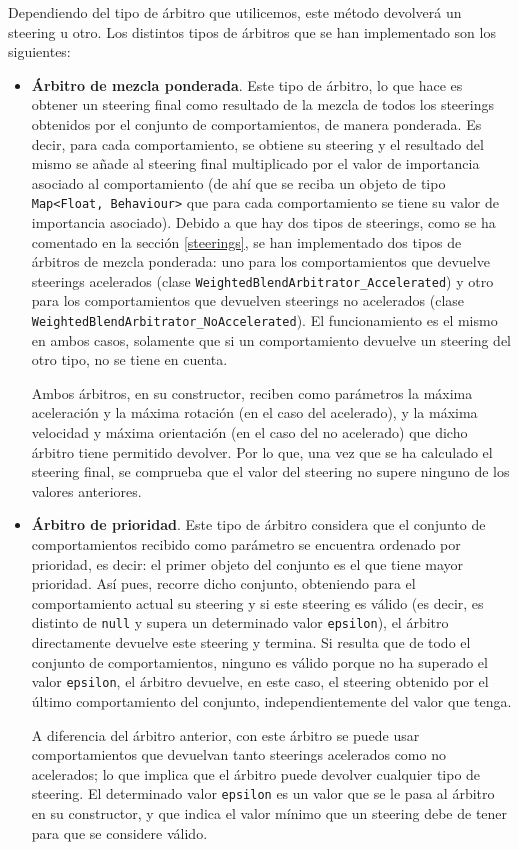 Dependiendo del tipo de árbitro que utilicemos, este método devolverá un steering u otro. Los distintos tipos de árbitros que se han implementado son los siguientes:
\begin{itemize}
 \item \textbf{Árbitro de mezcla ponderada}. Este tipo de árbitro, lo que hace es obtener un steering final como resultado de la mezcla de todos los steerings obtenidos por el conjunto de comportamientos, de manera ponderada. Es decir, para cada comportamiento, se obtiene su steering y el resultado del mismo se añade al steering final multiplicado por el valor de importancia asociado al comportamiento (de ahí que se reciba un objeto de tipo \texttt{Map<Float, Behaviour>} que para cada comportamiento se tiene su valor de importancia asociado). Debido a que hay dos tipos de steerings, como se ha comentado en la sección \ref{steerings}, se han implementado dos tipos de árbitros de mezcla ponderada: uno para los comportamientos que devuelve steerings acelerados (clase \texttt{WeightedBlendArbitrator\_Accelerated}) y otro para los comportamientos que devuelven steerings no acelerados (clase \texttt{WeightedBlendArbitrator\_NoAccelerated}). El funcionamiento es el mismo en ambos casos, solamente que si un comportamiento devuelve un steering del otro tipo, no se tiene en cuenta. 
 
 Ambos árbitros, en su constructor, reciben como parámetros la máxima aceleración y la máxima rotación (en el caso del acelerado), y la máxima velocidad y máxima orientación (en el caso del no acelerado) que dicho árbitro tiene permitido devolver. Por lo que, una vez que se ha calculado el steering final, se comprueba que el valor del steering no supere ninguno de los valores anteriores. 
 
 
 \item \textbf{Árbitro de prioridad}. Este tipo de árbitro considera que el conjunto de comportamientos recibido como parámetro se encuentra ordenado por prioridad, es decir: el primer objeto del conjunto es el que tiene mayor prioridad. Así pues, recorre dicho conjunto, obteniendo para el comportamiento actual su steering y si este steering es válido (es decir, es distinto de \texttt{null} y supera un determinado valor \texttt{epsilon}), el árbitro directamente devuelve este steering y termina. Si resulta que de todo el conjunto de comportamientos, ninguno es válido porque no ha superado el valor \texttt{epsilon}, el árbitro devuelve, en este caso, el steering obtenido por el último comportamiento del conjunto, independientemente del valor que tenga. 
 
 A diferencia del árbitro anterior, con este árbitro se puede usar comportamientos que devuelvan tanto steerings acelerados como no acelerados; lo que implica que el árbitro puede devolver cualquier tipo de steering. El determinado valor \texttt{epsilon} es un valor que se le pasa al árbitro en su constructor, y que indica el valor mínimo que un steering debe de tener para que se considere válido.
\end{itemize}







